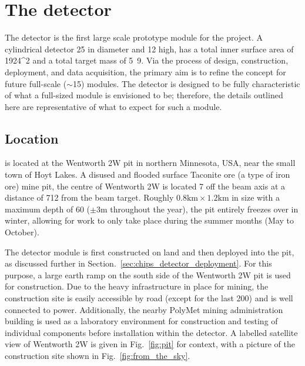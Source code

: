 \section{The \chipsfive detector} %
\label{sec:chips_detector} %

The \chipsfive detector is the first large scale prototype module for the \chips project. A
cylindrical detector \unit{25}{} in diameter and \unit{12}{} high, \chipsfive
has a total inner surface area of \unit{1924}{^2} and a total target mass of
\unit{5.9}{}. Via the process of design, construction, deployment, and data
acquisition, the primary \chipsfive aim is to refine the \chips concept for future full-scale
($\sim$\unit{15}{}) modules. The \chipsfive detector is designed to be fully
characteristic of what a full-sized \chips module is envisioned to be; therefore, the details
outlined here are representative of what to expect for such a module.

\subsection{Location} %
\label{sec:chips_detector_location} %

\chipsfive is located at the Wentworth 2W pit in northern Minnesota, USA, near the small town of
Hoyt Lakes. A disused and flooded surface Taconite ore (a type of iron ore) mine pit, the centre
of Wentworth 2W is located \unit{7}{} off the \numi beam axis at a distance of
\unit{712}{} from the beam target. Roughly $0.8\mathrm{km}\times1.2\mathrm{km}$ in size
with a maximum depth of \unit{60}{} ($\pm3\mathrm{m}$ throughout the year), the pit
entirely freezes over in winter, allowing for work to only take place during the summer months
(May to October).

The \chipsfive detector module is first constructed on land and then deployed into the pit, as
discussed further in Section.~\ref{sec:chips_detector_deployment}. For this purpose, a large earth
ramp on the south side of the Wentworth 2W pit is used for construction. Due to the heavy
infrastructure in place for mining, the construction site is easily accessible by road (except for
the last \unit{200}{}) and is well connected to power. Additionally, the nearby PolyMet
mining administration building is used as a laboratory environment for construction and testing of
individual components before installation within the detector. A labelled satellite view of
Wentworth 2W is given in Fig.~\ref{fig:pit} for context, with a picture of the construction site
shown in Fig.~\ref{fig:from_the_sky}.

